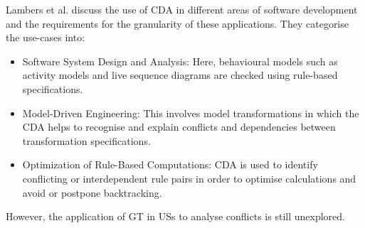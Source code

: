 Lambers et al. discuss the use of CDA in different areas of software development and the requirements for the granularity of these applications. They categorise the use-cases into:
\begin{itemize}
	\item Software System Design and Analysis: Here, behavioural models such as activity models and live sequence diagrams are checked using rule-based specifications. 
	
	\item Model-Driven Engineering: This involves model transformations in which the CDA helps to recognise and explain conflicts and dependencies between transformation specifications.
	
	\item Optimization of Rule-Based Computations: CDA is used to identify conflicting or interdependent rule pairs in order to optimise calculations and avoid or postpone backtracking.
\end{itemize}
However, the application of GT in USs to analyse conflicts is still unexplored.
